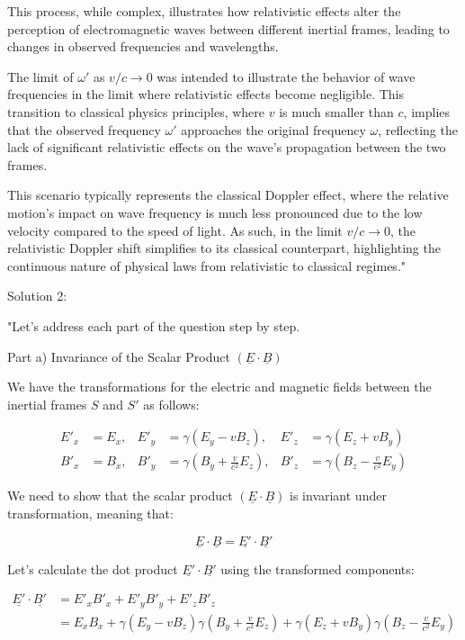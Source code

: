 This process, while complex, illustrates how relativistic effects alter the perception of electromagnetic waves between different inertial frames, leading to changes in observed frequencies and wavelengths.

The limit of \(\omega'\) as \(v/c \rightarrow 0\) was intended to illustrate the behavior of wave frequencies in the limit where relativistic effects become negligible. This transition to classical physics principles, where \(v\) is much smaller than \(c\), implies that the observed frequency \(\omega'\) approaches the original frequency \(\omega\), reflecting the lack of significant relativistic effects on the wave's propagation between the two frames.

This scenario typically represents the classical Doppler effect, where the relative motion's impact on wave frequency is much less pronounced due to the low velocity compared to the speed of light. As such, in the limit \(v/c \rightarrow 0\), the relativistic Doppler shift simplifies to its classical counterpart, highlighting the continuous nature of physical laws from relativistic to classical regimes."

Solution 2:

"Let's address each part of the question step by step.

Part a) Invariance of the Scalar Product \( (\underline{E} \cdot \underline{B}) \)

We have the transformations for the electric and magnetic fields between the inertial frames \( S \) and \( S' \) as follows:

\[
\begin{aligned}
E'_{x} &= E_{x}, & E'_{y} &= \gamma(E_{y} - vB_{z}), & E'_{z} &= \gamma(E_{z} + vB_{y}) \\
B'_{x} &= B_{x}, & B'_{y} &= \gamma(B_{y} + \frac{v}{c^{2}} E_{z}), & B'_{z} &= \gamma(B_{z} - \frac{v}{c^{2}} E_{y})
\end{aligned}
\]

We need to show that the scalar product \( (\underline{E} \cdot \underline{B}) \) is invariant under transformation, meaning that:

\[
\underline{E} \cdot \underline{B} = \underline{E'} \cdot \underline{B'}
\]

Let's calculate the dot product \( \underline{E'} \cdot \underline{B'} \) using the transformed components:

\[
\begin{aligned}
\underline{E'} \cdot \underline{B'} &= E'_{x}B'_{x} + E'_{y}B'_{y} + E'_{z}B'_{z} \\
&= E_{x}B_{x} + \gamma(E_{y} - vB_{z})\gamma(B_{y} + \frac{v}{c^{2}}E_{z}) + \gamma(E_{z} + vB_{y})\gamma(B_{z} - \frac{v}{c^{2}}E_{y})
\end{aligned}
\]

